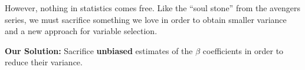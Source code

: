 \documentclass[12pt]{notes}
\begin{document}
\nspace
However, nothing in statistics comes free. Like the ``soul stone'' from the avengers series, we must sacrifice something we love in order to obtain smaller variance and a new approach for variable selection. 

\nspace
\textbf{Our Solution:} Sacrifice \textbf{unbiased} estimates of the $\beta$ coefficients in order to reduce their variance. 


 \begin{minipage}[l][4cm][c]{\textwidth}

\end{minipage}

\newpage
{}

 \begin{minipage}[l][3cm][c]{\textwidth}

\end{minipage}

 \begin{minipage}[l][2cm][c]{\textwidth}

\end{minipage}
\end{document}

